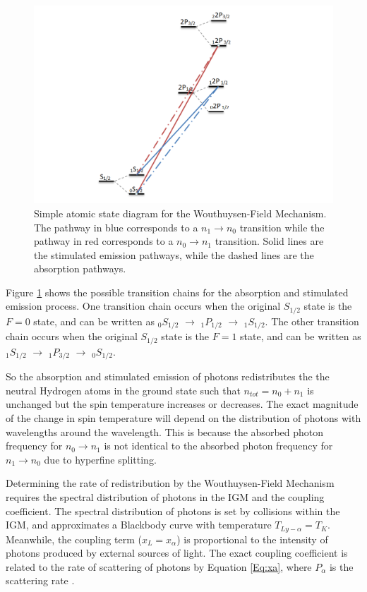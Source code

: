 \begin{figure}[htb]
\begin{center}
\includegraphics[width=0.95\linewidth]{Introduction/figures/wfm_states.png}
\caption{Simple atomic state diagram for the Wouthuysen-Field Mechanism. The pathway in blue corresponds to a $n_1 \rightarrow n_0$ transition while the pathway in red corresponds to a $n_0 \rightarrow n_1$ transition. Solid lines are the stimulated emission pathways, while the dashed lines are the absorption pathways.}
\label{Fig:wfm_states}
\end{center}
\end{figure}

Figure \ref{Fig:wfm_states} shows the possible transition chains for the \lya absorption and stimulated emission process. One transition chain occurs when the original $S_{1/2}$ state is the $F=0$ state, and can be written as $_0S_{1/2}$ $\rightarrow$ $_1P_{1/2}$ $\rightarrow$ $_1S_{1/2}$. The other transition chain occurs when the original $S_{1/2}$ state is the $F=1$ state, and can be written as $_1S_{1/2}$ $\rightarrow$ $_1P_{3/2}$ $\rightarrow$ $_0S_{1/2}$. 

So the absorption and stimulated emission of \lya photons redistributes the the neutral Hydrogen atoms in the ground state such that $n_{tot} = n_0 + n_1$ is unchanged but the spin temperature increases or decreases. The exact magnitude of the change in spin temperature will depend on the distribution of photons with wavelengths around the \lya wavelength. This is because the absorbed photon frequency for $n_0 \rightarrow n_1$ is not identical to the absorbed photon frequency for $n_1 \rightarrow n_0$ due to hyperfine splitting. 

Determining the rate of redistribution by the Wouthuysen-Field Mechanism requires the spectral distribution of \lya photons in the IGM and the \lya coupling coefficient. The spectral distribution of \lya photons is set by collisions within the IGM, and approximates a Blackbody curve with temperature $T_{Ly-\alpha} = T_K$. Meanwhile, the \lya  coupling term ($x_L = x_{\alpha}$) is proportional to the intensity of \lya  photons produced by external sources of light. The exact \lya  coupling coefficient is related to the rate of scattering of \lya  photons by Equation \ref{Eq:xa}, where $P_{\alpha}$ is the scattering rate \cite{furlanetto_2006}. 

